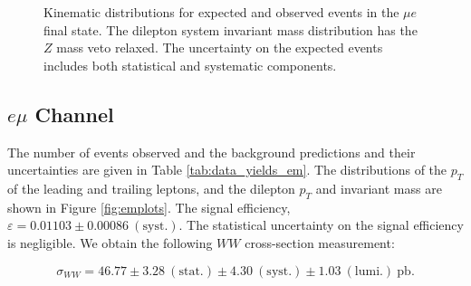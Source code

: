 \begin{figure}[!hbtp]
\begin{center}
\caption{Kinematic distributions for expected and observed events in the $\mu{e}$ final state.
The dilepton system invariant mass distribution has the $Z$ mass veto relaxed.
The uncertainty on the expected events includes both statistical and systematic components.}
\label{fig:meplots}
\end{center}
\end{figure}

%
%
%
\clearpage
\subsection{$e \mu$ Channel}

The number of events observed and the background predictions and their uncertainties are
given in Table \ref{tab:data_yields_em}.
The distributions of the $p_{T}$ of the leading and trailing leptons, and the dilepton $p_{T}$
and invariant mass are shown in Figure \ref{fig:emplots}.
The signal efficiency,  $\varepsilon = 0.01103 \pm 0.00086~\mathrm{(syst.)}$.
The statistical uncertainty on the signal efficiency is negligible.
We obtain the following $WW$ cross-section measurement:

\begin{equation*}
\sigma_{WW}  = 46.77 \pm 3.28~\mathrm{(stat.)} \pm 4.30~\mathrm{(syst.)} \pm 1.03~\mathrm{(lumi.)~pb} .
\end{equation*}

